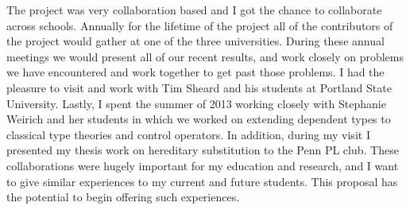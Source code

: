 \begin{full}
The project was very collaboration based and I got the chance to
collaborate across schools.  Annually for the lifetime of the project
all of the contributors of the project would gather at one of the
three universities.  During these annual meetings we would present all
of our recent results, and work closely on problems we have
encountered and work together to get past those problems.  I had the
pleasure to visit and work with Tim Sheard and his students at
Portland State University.  Lastly, I spent the summer of 2013 working
closely with Stephanie Weirich and her students in which we worked on
extending dependent types to classical type theories and control
operators.  In addition, during my visit I presented my thesis work on
hereditary substitution to the Penn PL club.  These collaborations
were hugely important for my education and research, and I want to
give similar experiences to my current and future students.  This
proposal has the potential to begin offering such experiences.


\end{full}





